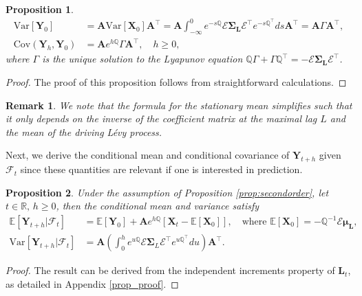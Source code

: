\documentclass[12pt]{amsart}
\newtheorem{prop}{Proposition}[section]
\newtheorem{remark}{Remark}[section]
\numberwithin{equation}{section}
\newcommand{\E}{\mathbb{E}}
\newcommand{\1}{\mathbf{1}}
\begin{document}
\begin{prop}
\begin{align*}
    \mathrm{Var}[\mathbf{Y}_0]
     &=\mathbf{A}\mathrm{Var}[\mathbf{X}_0]\mathbf{A}^{\top}
     =\mathbf{A}\int_{-\infty}^0e^{-s\mathbb{Q}}\mathcal{E}\boldsymbol{\Sigma}_{\mathbf{L}}\mathcal{E}^{\top} e^{-s\mathbb{Q}^{\top}}ds  \mathbf{A}^{\top}   =\mathbf{A}\Gamma\mathbf{A}^{\top},\\
     \mathrm{Cov}(\mathbf{Y}_h, \mathbf{Y}_{0})
     &=\mathbf{A} e^{h\mathbb{Q}} \Gamma \mathbf{A}^{\top}, \quad h \geq 0,
\end{align*}
where $\Gamma$ is the unique solution to the Lyapunov equation $\mathbb{Q}\Gamma + \Gamma\mathbb{Q}^{\top} = -\mathcal{E}\boldsymbol{\Sigma}_{\mathbf{L}}\mathcal{E}^{\top}$. 
\end{prop}
\begin{proof} The proof of this proposition follows from straightforward calculations.
\end{proof}
\begin{remark}
We note that the formula for the stationary mean simplifies such that it only depends on the inverse of the coefficient matrix at the maximal lag $L$ and the mean of the driving L\'{e}vy process.
\end{remark}
Next, we derive the conditional mean and conditional covariance of $\mathbf{Y}_{t+h}$ given $\mathcal{F}_t$ since these quantities are relevant if one is interested in prediction.
\begin{prop}\label{prop:secondorder-cond} Under the assumption of Proposition \ref{prop:secondorder}, let $t\in \mathbb{R},\, h \geq 0$, then the conditional mean and variance satisfy
\begin{align*}
    \mathbb{E}[\textbf{Y}_{t+h}\vert\mathcal{F}_t] &=
    \E[\mathbf{Y}_0]+\mathbf{A}e^{h\mathbb{Q}}[\mathbf{X}_{t}-\E[\mathbf{X}_0]], \quad \mathrm{where}\,\, \E[\mathbf{X}_0]=-\mathbb{Q}^{-1} \mathcal{E}\boldsymbol{\mu}_{\mathbf{L}}, \\
    \mathrm{Var}[\textbf{Y}_{t+h}\vert\mathcal{F}_t] &=
    \mathbf{A} \left(\int_{0}^{h}e^{u\mathbb{Q}}\mathcal{E}\boldsymbol{\Sigma}_L\mathcal{E}^{\top} e^{u\mathbb{Q}^{\top}}du\right)\mathbf{A}^{\top}.
\end{align*}
\end{prop}
\begin{proof}
The result can be derived from the independent increments property of $\textbf{L}_t$, as detailed in Appendix \ref{prop_proof}.
\end{proof}
\end{document}
